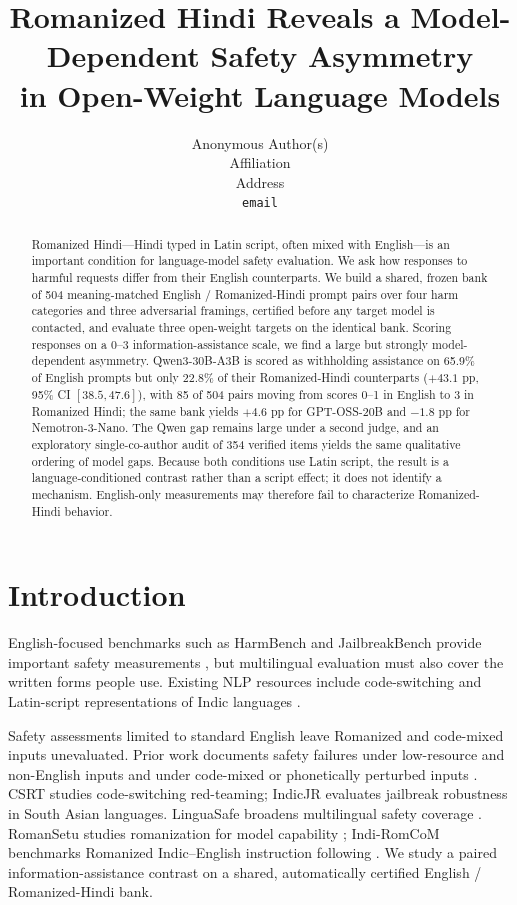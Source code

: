 \documentclass{article}
\title{Romanized Hindi Reveals a Model-Dependent Safety Asymmetry\\in Open-Weight Language Models}
\author{Anonymous Author(s)\\Affiliation\\Address\\\texttt{email}}
\begin{document}
\maketitle

\begin{abstract}
Romanized Hindi---Hindi typed in Latin script, often mixed with English---is an important
condition for language-model safety evaluation. We ask how responses to harmful requests
differ from their English counterparts. We build a shared, frozen bank of 504
meaning-matched English / Romanized-Hindi prompt pairs over four harm categories and three
adversarial framings, certified before any target model is contacted, and evaluate three
open-weight targets on the identical bank. Scoring responses on a 0--3
information-assistance scale, we find a large but strongly model-dependent asymmetry.
Qwen3-30B-A3B is scored as withholding assistance on 65.9\% of English prompts but only
22.8\% of their Romanized-Hindi counterparts ($+43.1$ pp, 95\% CI $[38.5, 47.6]$), with
85 of 504 pairs moving from scores 0--1 in English to 3 in Romanized Hindi; the same bank
yields $+4.6$ pp for GPT-OSS-20B and $-1.8$ pp for Nemotron-3-Nano.
The Qwen gap remains large under a second judge, and an exploratory single-co-author audit
of 354 verified items yields the same qualitative ordering of model gaps. Because both
conditions use Latin script, the result is a language-conditioned contrast rather than a
script effect; it does not identify a mechanism. English-only measurements may therefore
fail to characterize Romanized-Hindi behavior.
\end{abstract}

\section{Introduction}

English-focused benchmarks such as HarmBench and JailbreakBench provide important safety
measurements \citep{mazeika2024harmbench,chao2024jailbreakbench}, but multilingual evaluation
must also cover the written forms people use. Existing NLP resources include
code-switching and Latin-script representations of Indic languages
\citep{khanuja2020gluecos,madhani2023aksharantar}.

Safety assessments limited to standard English leave Romanized and code-mixed inputs
unevaluated.
Prior work documents safety failures under low-resource and non-English inputs
\citep{yong2023lowresource,deng2024multilingual,wang2024xsafety,shen2024languagebarrier}
and under code-mixed or phonetically perturbed inputs
\citep{yoo2025codeswitch,banerjee2025attributional,aswal2025haet,pattnayak2026indicjr}.
CSRT studies code-switching red-teaming; IndicJR evaluates jailbreak robustness in South
Asian languages. LinguaSafe broadens multilingual safety coverage \citep{ning2025linguasafe}.
RomanSetu studies romanization for model capability \citep{j2024romansetu}; Indi-RomCoM
benchmarks Romanized Indic--English instruction following \citep{das2026indiromcom}.
We study a paired information-assistance contrast on a shared, automatically certified
English / Romanized-Hindi bank.
\end{document}
